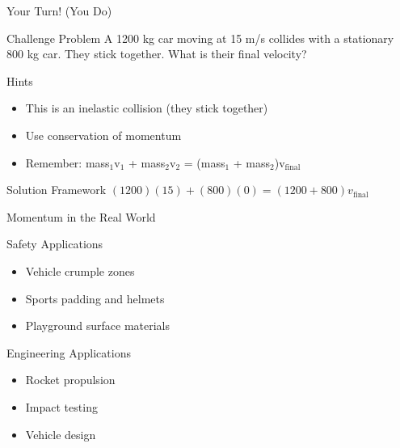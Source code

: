 \documentclass{beamer}
\begin{document}
\begin{frame}{Your Turn! (You Do)}
\begin{block}{Challenge Problem}
A 1200 kg car moving at 15 m/s collides with a stationary 800 kg car. They stick together.
What is their final velocity?
\end{block}

\begin{block}{Hints}
\begin{itemize}
\item This is an inelastic collision (they stick together)
\item Use conservation of momentum
\item Remember: mass$_1$v$_1$ + mass$_2$v$_2$ = (mass$_1$ + mass$_2$)v$_\text{final}$
\end{itemize}
\end{block}

\pause

\begin{block}{Solution Framework}
$(1200)(15) + (800)(0) = (1200 + 800)v_\text{final}$
\end{block}
\end{frame}

\begin{frame}{Momentum in the Real World}
\begin{block}{Safety Applications}
\begin{itemize}
\item Vehicle crumple zones
\item Sports padding and helmets
\item Playground surface materials
\end{itemize}
\end{block}

\begin{block}{Engineering Applications}
\begin{itemize}
\item Rocket propulsion
\item Impact testing
\item Vehicle design
\end{itemize}
\end{block}
\end{frame}
\end{document}
